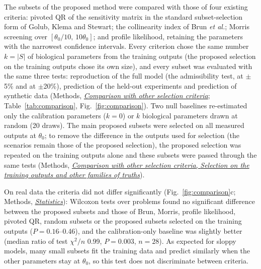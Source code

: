 \documentclass[pdflatex,sn-nature]{sn-jnl}
\theoremstyle{plain}
\newcommand{\mref}[2]{\hyperref[#1]{#2}}
\begin{document}
The subsets of the proposed method were compared with those of four existing criteria: pivoted QR of the sensitivity matrix in the standard subset-selection form of Golub, Klema and Stewart\cite{bib57,bib40}; the collinearity index of Brun \emph{et al.}\cite{bib9}; Morris screening over $[\theta_0/10,\,10\theta_0]$\cite{bib23}; and profile likelihood\cite{bib24,bib37}, retaining the parameters with the narrowest confidence intervals. Every criterion chose the same number $k=|S|$ of biological parameters from the training outputs (the proposed selection on the training outputs chose its own size), and every subset was evaluated with the same three tests: reproduction of the full model (the admissibility test, at $\pm$5\% and at $\pm$20\%), prediction of the held-out experiments and prediction of synthetic data (Methods, \mref{met:comparison}{\emph{Comparison with other selection criteria}}; Table~\ref{tab:comparison}, Fig.~\ref{fig:comparison}). Two null baselines re-estimated only the calibration parameters ($k=0$) or $k$ biological parameters drawn at random (20 draws). The main proposed subsets were selected on all measured outputs at $\theta_0$; to remove the difference in the outputs used for selection (the scenarios remain those of the proposed selection), the proposed selection was repeated on the training outputs alone and these subsets were passed through the same tests (Methods, \mref{met:comp-train}{\emph{Comparison with other selection criteria}, \emph{Selection on the training outputs and other families of truths}}).

On real data the criteria did not differ significantly (Fig.~\ref{fig:comparison}c; Methods, \mref{met:stats}{\emph{Statistics}}): Wilcoxon tests over problems found no significant difference between the proposed subsets and those of Brun, Morris, profile likelihood, pivoted QR, random subsets or the proposed subsets selected on the training outputs ($P=0.16$--0.46), and the calibration-only baseline was slightly better (median ratio of test $\chi^2/n$ 0.99, $P=0.003$, $n=28$). As expected for sloppy models\cite{bib15}, many small subsets fit the training data and predict similarly when the other parameters stay at $\theta_0$, so this test does not discriminate between criteria.
\end{document}
